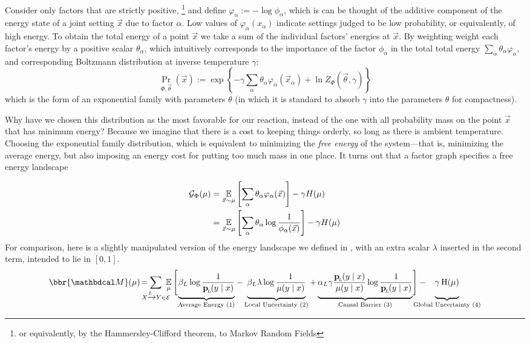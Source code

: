 Consider only factors that are strictly positive,%
	\footnote{or equivalently, by the Hammersley-Clifford theorem, to Markov Random Fields}
and define $ \varphi_\alpha := -\log \phi_\alpha$, which is can be thought of the additive component of the energy state of a joint setting $\vec x$ due to factor $\alpha$. 
Low values of $\varphi_\alpha(x_\alpha)$ indicate settings judged to be low probability, or equivalently, of high energy. 
To obtain the total energy of a point $\vec x$ we take a sum of the individual factors' energies at $\vec x$. By weighting weight each factor's energy by a positive scalar $\theta_\alpha$, which intuitively corresponds to the importance of the factor $\phi_\alpha$ in the total total energy $\sum_\alpha \theta_\alpha \varphi_\alpha$,
and corresponding Boltzmann distribution at inverse temperature $\gamma$:
\[ \Pr_{\Phi, \vec\theta} (\vec x)  := \exp \left\{ -\gamma \sum_\alpha \theta_\alpha \varphi_\alpha(\vec x_\alpha)  + \ln Z_\Phi(\vec \theta, \gamma) \right\} \] 
which is the form of an exponential family with parameters $\theta$ (in which it is standard to absorb $\gamma$ into the parameters $\theta$ for compactness).

Why have we chosen this distribution as the most favorable for our reaction, instead of the one with all probability mass on the point $\vec x$ that has minimum energy? Because we imagine that there is a cost to keeping things orderly, so long as there is ambient temperature. Choosing the exponential family distribution, which is equivalent to minimizing the \emph{free energy} of the system---that is, minimizing the average energy, but also imposing an energy cost for putting too much mass in one place. It turns out that a factor graph specifies a free energy landscape

\begin{align*}
	\mathcal G_\Phi(\mu) &=  \operatorname*{\mathbb{E}}_{\vec x \sim \mu} \left[\sum_\alpha \theta_\alpha \varphi_\alpha(\vec x) \right] - \gamma H(\mu) \\
		&= \operatorname*{\mathbb{E}}_{\vec x \sim \mu} \left[\sum_\alpha \theta_\alpha \log \frac{1}{\phi_\alpha(\vec x)} \right] - \gamma H(\mu)
\end{align*}
For comparison, here is a slightly manipulated version of the energy landscape we defined in , with an extra scalar $\lambda$ inserted in the second term, intended to lie in $[0,1]$.
\begin{equation*}
	\bbr{\dg M}(\mu) \!=\mskip-18mu \sum_{ X \xrightarrow{\!\!L} Y  \in \Ed } \!\!\!\!\E_\mu  \Bigg[\!
		\underbrace{\beta_L \log \frac{1}{\bp(y\mid x)} \vphantom{\Bigg|}}_{\text{Average Energy (1)}}  - 
		\underbrace{\beta_L \lambda \log \frac{1}{\mu(y \mid x)}  \vphantom{\Bigg|}}_{\text{Local Uncertainty (2)}}  + 
		\underbrace{\alpha_L \gamma \frac{\bp(y \mid x)}{\mu(y \mid x)}\log \frac{1}{\bp(y\mid x)}  \vphantom{\Bigg|}}_{\text{Causal Barrier (3)}}\! \Bigg] - 
		\mskip-31mu\underbrace{\gamma \H(\mu) \vphantom{\Bigg|} }_{\text{Global Uncertainty (4)}}
\end{equation*}


